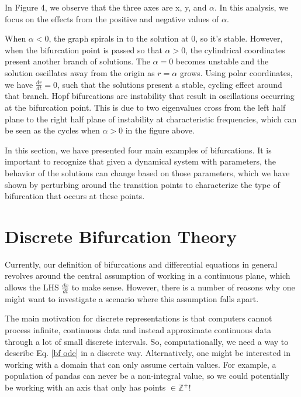 \documentclass{article}
\theoremstyle{definition}
\theoremstyle{remark}
\begin{document}
In Figure 4, we observe that the three axes are x, y, and $\alpha$. In this analysis, we focus on the effects from the positive and negative values of $\alpha$. 

When $\alpha < 0$, the graph  spirals in to the solution at $0$, so it's stable. However, when the bifurcation point is passed so that $\alpha > 0$, the cylindrical coordinates present another branch of solutions. The $\alpha = 0$ becomes unstable and the solution oscillates away from the origin as $r = \alpha$ grows. Using polar coordinates, we have $\frac{dr}{dt} = 0$, such that the solutions present a stable, cycling effect around that branch. Hopf bifurcations are instability that result in oscillations occurring at the bifurcation point. This is due to two eigenvalues cross from the left half plane to the right half plane of instability at characteristic frequencies, which can be seen as the cycles when $\alpha > 0$ in the figure above.

In this section, we have presented four main examples of bifurcations. It is important to recognize that given a dynamical system with parameters, the behavior of the solutions can change based on those parameters, which we have shown by perturbing around the transition points to characterize the type of bifurcation that occurs at these points.

\section{Discrete Bifurcation Theory}\label{dbt}
Currently, our definition of bifurcations and differential equations in general revolves around the central assumption of working in a continuous plane, which allows the LHS $\frac{dx}{dt}$ to make sense. However, there is a number of reasons why one might want to investigate a scenario where this assumption falls apart. 

The main motivation for discrete representations is that computers cannot process infinite, continuous data and instead approximate continuous data through a lot of small discrete intervals. So, computationally, we need a way to describe Eq. \ref{bf ode} in a discrete way. Alternatively, one might be interested in working with a domain that can only assume certain values. For example, a population of pandas can never be a non-integral value, so we could potentially be working with an axis that only has points $\in \mathbb{Z}^+$! 
\end{document}
